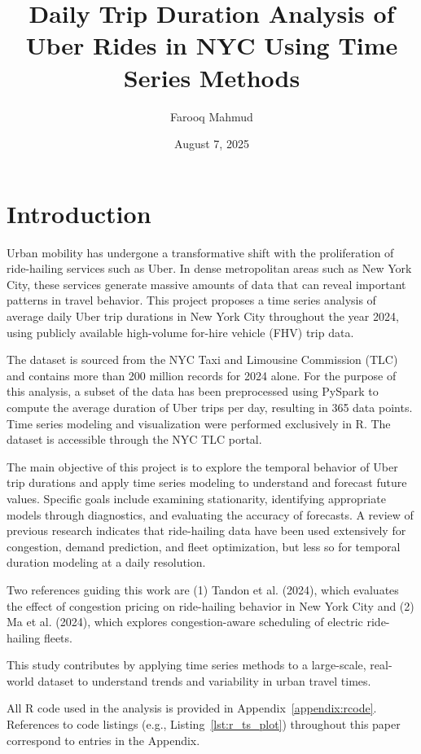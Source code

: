 \documentclass{article}
\title{Daily Trip Duration Analysis of Uber Rides in NYC Using Time Series Methods }
\author{
    Farooq Mahmud
}
\date{August 7, 2025}
\begin{document}
\maketitle

\tableofcontents

\section{Introduction}
Urban mobility has undergone a transformative shift with the proliferation of ride-hailing services such as Uber. In dense metropolitan areas such as New York City, these services generate massive amounts of data that can reveal important patterns in travel behavior. This project proposes a time series analysis of average daily Uber trip durations in New York City throughout the year 2024, using publicly available high-volume for-hire vehicle (FHV) trip data.

The dataset is sourced from the NYC Taxi and Limousine Commission (TLC) and contains more than 200 million records for 2024 alone. For the purpose of this analysis, a subset of the data has been preprocessed using PySpark to compute the average duration of Uber trips per day, resulting in 365 data points. Time series modeling and visualization were performed exclusively in R. The dataset is accessible through the NYC TLC portal\cite{nyctlc2024}.

The main objective of this project is to explore the temporal behavior of Uber trip durations and apply time series modeling to understand and forecast future values. Specific goals include examining stationarity, identifying appropriate models through diagnostics, and evaluating the accuracy of forecasts. A review of previous research indicates that ride-hailing data have been used extensively for congestion, demand prediction, and fleet optimization, but less so for temporal duration modeling at a daily resolution.

Two references guiding this work are (1) Tandon et al. (2024), which evaluates the effect of congestion pricing on ride-hailing behavior in New York City\cite{tandon2024congestion} and (2) Ma et al. (2024), which explores congestion-aware scheduling of electric ride-hailing fleets\cite{ma2024congestion}.

This study contributes by applying time series methods to a large-scale, real-world dataset to understand trends and variability in urban travel times.

All R code used in the analysis is provided in Appendix~\ref{appendix:rcode}. References to code listings (e.g., Listing~\ref{lst:r_ts_plot}) throughout this paper correspond to entries in the Appendix.
\end{document}
